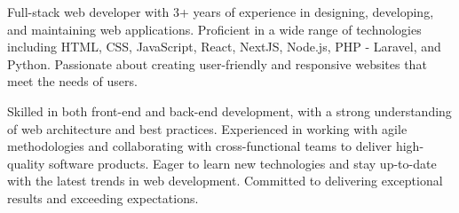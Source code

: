 

\begin{cvparagraph}

Full-stack web developer with 3+ years of experience in designing, developing, and maintaining web applications. Proficient in a wide range of technologies including HTML, CSS, JavaScript, React, NextJS, Node.js, PHP - Laravel, and Python. Passionate about creating user-friendly and responsive websites that meet the needs of users.

Skilled in both front-end and back-end development, with a strong understanding of web architecture and best practices. Experienced in working with agile methodologies and collaborating with cross-functional teams to deliver high-quality software products.
Eager to learn new technologies and stay up-to-date with the latest trends in web development. Committed to delivering exceptional results and exceeding expectations.
\end{cvparagraph}